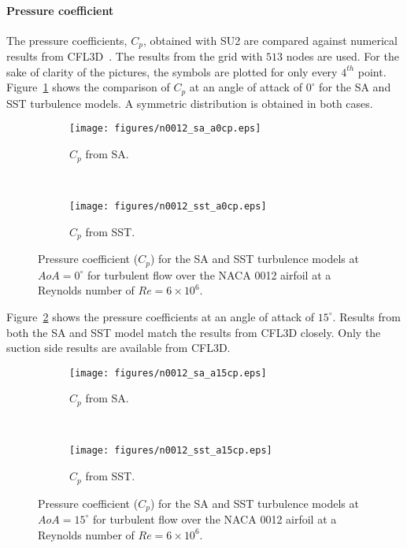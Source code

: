 \paragraph{Pressure coefficient}
The pressure coefficients, $C_p$, obtained with SU2 are compared against numerical results from CFL3D~\cite{NASATMR}. The results from the grid with $513$ nodes are used. For the sake of clarity of the pictures, the symbols are plotted for only every $4^{th}$ point. Figure~\ref{fig:tn012cpa0} shows the comparison of $C_p$ at an angle of attack of $0^{\circ}$ for the SA and SST turbulence models. A symmetric distribution is obtained in both cases.
\begin{figure}[h!]
    \centering
    \captionsetup{justification=centering}
    \begin{subfigure}[b]{0.48\textwidth}
    \captionsetup{justification=centering}
        \texttt{[image: figures/n0012\_sa\_a0cp.eps]}
        \caption{$C_p$ from SA.}
    \end{subfigure}
    ~ %
    \begin{subfigure}[b]{0.48\textwidth}
    \centering
    \captionsetup{justification=centering}
        \texttt{[image: figures/n0012\_sst\_a0cp.eps]}
        \caption{$C_p$ from SST.}
    \end{subfigure}
    \caption{Pressure coefficient ($C_p$) for the SA and SST turbulence models at $AoA=0^{\circ}$ for turbulent flow over the NACA 0012 airfoil at a Reynolds number of $Re=6\times10^6$.}
    \label{fig:tn012cpa0}
    \end{figure}
Figure~\ref{fig:tn012cpa15} shows the pressure coefficients at an angle of attack of $15^{\circ}$. Results from both the SA and SST model match the results from CFL3D closely. Only the suction side results are available from CFL3D.
\begin{figure}[h!]
    \centering
    \captionsetup{justification=centering}
    \begin{subfigure}[b]{0.48\textwidth}
    \captionsetup{justification=centering}
        \texttt{[image: figures/n0012\_sa\_a15cp.eps]}
        \caption{$C_p$ from SA.}
    \end{subfigure}
    ~ %
    \begin{subfigure}[b]{0.48\textwidth}
    \centering
    \captionsetup{justification=centering}
        \texttt{[image: figures/n0012\_sst\_a15cp.eps]}
        \caption{$C_p$ from SST.}
    \end{subfigure}
    \caption{Pressure coefficient ($C_p$) for the SA and SST turbulence models at $AoA=15^{\circ}$ for turbulent flow over the NACA 0012 airfoil at a Reynolds number of $Re=6\times10^6$.}
     \label{fig:tn012cpa15}
\end{figure}


